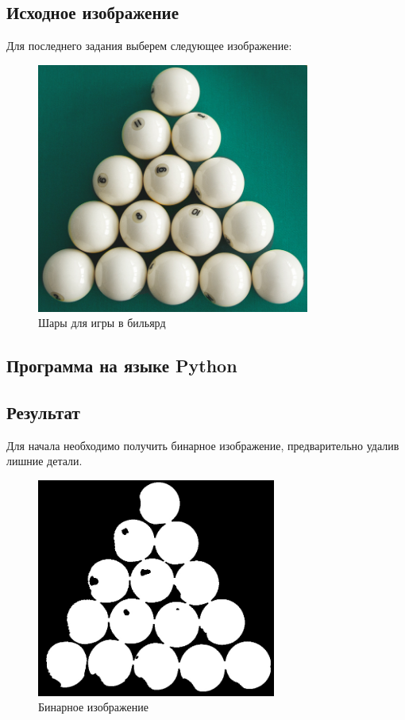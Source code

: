 \subsection{Исходное изображение}

Для последнего задания выберем следующее изображение:

\begin{figure}[ht!]
    \centering
    \includegraphics[width=0.8\textwidth]{images/source_images/snooker.jpg}
    \caption{Шары для игры в бильярд}
    \label{img:billiard_balls}
\end{figure} 

\subsection{Программа на языке Python}


\subsection{Результат}

Для начала необходимо получить бинарное изображение, предварительно удалив лишние детали.

\begin{figure}[ht!]
    \centering
    \includegraphics[width=0.7\textwidth]{images/transformed_images/3/Binary_closed.jpg}
    \caption{Бинарное изображение}
    \label{img:bin_balls}
\end{figure} 

